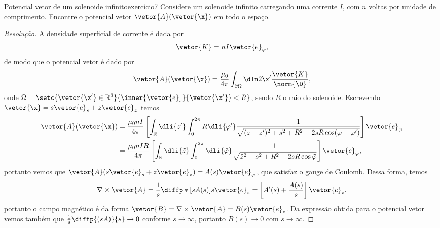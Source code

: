\begin{exercício}{Potencial vetor de um solenoide infinito}{exercício7}
    Considere um solenoide infinito carregando uma corrente \(I\), com \(n\) voltas por unidade de comprimento. Encontre o potencial vetor \(\vetor{A}(\vetor{\x})\) em todo o espaço.
\end{exercício}
\begin{proof}[Resolução]
    A densidade superficial de corrente é dada por
    \begin{equation*}
        \vetor{K} = n I \vetor{e}_{\varphi},
    \end{equation*}
    de modo que o potencial vetor é dado por
    \begin{equation*}
        \vetor{A}(\vetor{\x}) = \frac{\mu_0}{4\pi}\int_{\partial\Omega} \dln2{\x'} \frac{\vetor{K}}{\norm{\D}},
    \end{equation*}
    onde \(\Omega = \setc{\vetor{\x'} \in \mathbb{R}^3}{\inner{\vetor{e}_s}{\vetor{\x'}} < R}\), sendo \(R\) o raio do solenoide. Escrevendo \(\vetor{\x} = s \vetor{e}_s + z \vetor{e}_z\) temos
    \begin{align*}
        \vetor{A}(\vetor{\x}) &= \frac{\mu_0 n I}{4\pi} \left[\int_{\mathbb{R}} \dli{z'} \int_{0}^{2\pi} R \dli{\varphi'} \frac{1}{\sqrt{(z - z')^2 + s^2 + R^2 - 2 s R \cos(\varphi - \varphi')}}\right]\vetor{e}_\varphi\\
                              &= \frac{\mu_0 n IR}{4\pi}\left[\int_{\mathbb{R}} \dli{\tilde{z}} \int_{0}^{2\pi}\dli{\tilde{\varphi}} \frac{1}{\sqrt{\tilde{z}^2 + s^2 + R^2 - 2 s R \cos\tilde{\varphi}}}\right]\vetor{e}_\varphi,
    \end{align*}
    portanto vemos que \(\vetor{A}(s \vetor{e}_s + z\vetor{e}_z) = A(s)\vetor{e}_\varphi\), que satisfaz o gauge de Coulomb. Dessa forma, temos
    \begin{equation*}
        \nabla\times \vetor{A} = \frac{1}{s} \diffp*{\left[s A(s)\right]}{s} \vetor{e}_z = \left[A'(s) + \frac{A(s)}{s}\right]\vetor{e}_z,
    \end{equation*}
    portanto o campo magnético é da forma \(\vetor{B} = \nabla\times \vetor{A} = B(s) \vetor{e}_z\). Da expressão obtida para o potencial vetor vemos também que \(\frac{1}{s}\diffp{(s A)}{s} \to 0\) conforme \(s \to \infty\), portanto \(B(s) \to 0\) com \(s \to \infty\).


\end{proof}
